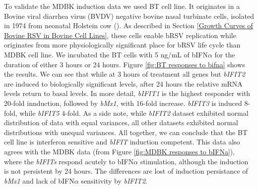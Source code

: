 To validate the MDBK induction data we used BT cell line. It originates in a Bovine viral diarrhea virus (BVDV) negative bovine nasal turbinate cells, isolated in 1974 from neonatal Holstein cow (\cite{McClurkin1974ComparisonVirus}). As described in Section \ref{Growth Curves of Bovine RSV in Bovine Cell Lines}, these cells enable bRSV replication while originates from more physiologically significant place for bRSV life cycle than MDBK cell line. We incubated the BT cells with 5 ng/mL of bIFN\(\alpha\) for the duration of either 3 hours or 24 hours. Figure \ref{fig:BT responses to bifna} shows the results. We can see that while at 3 hours of treatment all genes but \textit{bIFIT2} are induced to biologically significant levels, after 24 hours the relative mRNA levels return to basal levels. In more detail, \textit{bIFIT1} is the highest responder with 20-fold innduction, followed by \textit{bMx1}, with 16-fold increase. \textit{bIFIT3} is induced 8-fold, while \textit{bIFIT5} 4-fold. As a side note, while \textit{bIFIT2} dataset exhibited normal distribution of data with equal variances, all other datasets exhibited normal distributions with unequal variances. All together, we can conclude that the BT cell line is interferon sensitive and \textit{bIFIT} induction competent. This data also agrees with the MDBK data (from Figure \ref{fig:MDBK responses to bIFNa}), where the \textit{bIFITs} respond acutely to bIFN\(\alpha\) stimulation, although the induction is not persistent by 24 hours. The differences are lost of induction persistance of \textit{bMx1} and lack of bIFN\(\alpha\) sensitivity by \textit{bIFIT2}.

